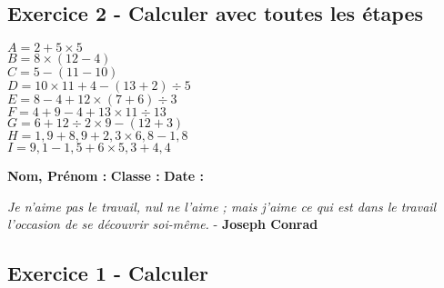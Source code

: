 \documentclass[11pt]{article}
\begin{document}
\subsection*{Exercice 2 - Calculer avec toutes les étapes}

\begin{multicols}{3}
  \noindent
  $A = 2+5\times 5 $\\
  $B = 8 \times (12 - 4) $\\
  $C = 5-(11-10) $\\
  $D = 10\times 11+4-(13+2)\div 5 $\\
  $E = 8-4+12\times (7+6)\div 3 $\\
  $F = 4+9-4+13\times 11\div 13 $\\
  $G = 6+12\div 2\times 9-(12+3) $\\
  $H = 1{,}9+8{,}9+2{,}3\times 6{,}8-1{,}8 $\\
  $I = 9{,}1-1{,}5+6\times 5{,}3+4{,}4$
\end{multicols}

\vspace{4cm}

\textbf{Nom, Prénom :} \hspace{8cm} \textbf{Classe :} \hspace{3cm} \textbf{Date :}\\
\vspace{-0.8cm}
\begin{center}
  \textit{Je n'aime pas le travail, nul ne l'aime ; mais j'aime ce qui est dans le travail l'occasion de se découvrir soi-même.}  - \textbf{Joseph Conrad}
\end{center}
\vspace{-0.8cm}

\subsection*{Exercice 1 - Calculer}
\end{document}

